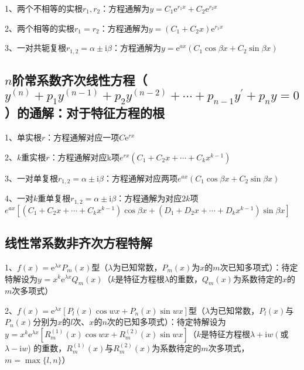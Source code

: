 1、两个不相等的实根$r_{1}, r_{2}$：方程通解为$ y=C_{1} \mathrm{e}^{r_1 x}+C_{2} \mathrm{e}^{r_2 x}$

2、两个相等的实根$r_{1}=r_{2}$：方程通解为$y=\left(C_{1}+C_{2} x\right) \mathrm{e}^{r_1 x}$

3、一对共轭复根$r_{1,2}=\alpha \pm \mathrm{i} \beta$：方程通解为$y=\mathrm{e}^{a x}\left(C_{1} \cos \beta x+C_{2} \sin \beta x\right)$



\subsection{$n$阶常系数齐次线性方程（$y^{(n)}+p_{1} y^{(n-1)}+p_{2} y^{(n-2)}+\cdots+p_{n-1} y^{\prime}+p_{n} y=0$）的通解：对于特征方程的根}

1、单实根$r$：方程通解对应一项$ C \mathrm{e}^{rx}$

2、$k$重实根$r$：方程通解对应k项${e}^{r x}\left(C_{1}+C_{2} x+\cdots+C_{k} x^{k-1}\right)$

3、一对单复根$r_{1,2}=\alpha \pm \mathrm{i} \beta$：方程通解对应两项${e}^{a x}\left(C_{1} \cos \beta x+C_{2} \sin \beta x\right)$

4、一对$k$重单复根$r_{1,2}=\alpha \pm \mathrm{i} \beta$：方程通解为对应$2k$项${e}^{{ax}}[(C_{1}+C_{2} x+\cdots+C_{k} x^{k-1}) \cos \beta x+(D_{1}+D_{2} x+\cdots+D_{k} x^{k-1}) \sin \beta x]$



\subsection{线性常系数非齐次方程特解}

1、$f(x)=\mathrm{e}^{\lambda x} P_{m}(x)$型（$\lambda$为已知常数，$P_{m}(x)$为$x$的$m$次已知多项式）：待定特解设为$y^{}=x^{k} \mathrm{e}^{\lambda x} Q_{m}(x)$（$k$是特征方程根$\lambda$的重数，$Q_{m}(x)$为系数待定的$x$的$m$次多项式）

2、$f(x)=\mathrm{e}^{\lambda x}\left[P_{l}(x) \cos w x+P_{n}(x) \sin w x\right]$型（$\lambda$为已知常数，$P_{l}(x)$与$P_{n}(x)$分别为$x$的$l$次、$x$的$n$次的已知多项式）：待定特解设为$y^{}=x^{k} \mathrm{e}^{\lambda x}\left[R_{m}^{(1)}(x) \cos w x+R_{m}^{(2)}(x) \sin w x\right]$（$k$是特征方程根$\lambda+\mathrm{i} w\left(\right.$或$\lambda-\mathrm{i} w$) 的重数，$R_{m}^{(1)}(x)$与$R_{m}^{(2)}(x)$为系数待定的$m$次多项式，$m=\max \{l, n\}$）

